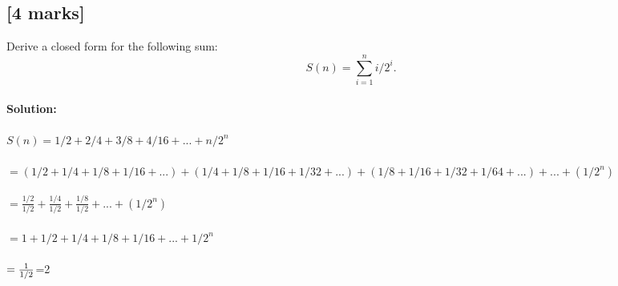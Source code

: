 \documentclass[12pt]{article}
\begin{document}
\subsection{[4 marks]}
Derive a closed form for the following sum:
$$
S(n) = \sum_{i=1}^n i/2^i.
$$
\\\textbf{Solution: }
\\
\\$S(n) = 1/2 + 2/4 + 3/8 + 4/16 + ... + n/2^n$
\\
\\$= (1/2 + 1/4 + 1/8 + 1/16 + ...) + (1/4 + 1/8 + 1/16 + 1/32 + ...) + (1/8 + 1/16 + 1/32 + 1/64 + ...) + ... + (1/2^n)$
\\
\\$= \frac{1/2} {1/2} + \frac{1/4} {1/2} + \frac{1/8}{1/2} + ... + (1/2^n)$
\\
\\$= 1 + 1/2 + 1/4 + 1/8 + 1/16 + ... + 1/2^n$
\\
\\$=\frac{1}{1/2}
\\
\\$=2

\end{document}
